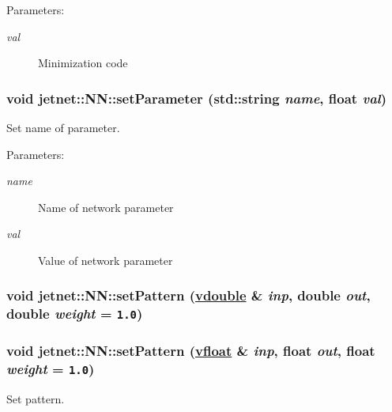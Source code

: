 \begin{Desc}
\item[Parameters:]
\begin{description}
\item[{\em val}]Minimization code \end{description}
\end{Desc}
\hypertarget{classjetnet_1_1NN_a5}{
\subsubsection[setParameter]{\setlength{\rightskip}{0pt plus 5cm}void jetnet::NN::set\-Parameter (std::string {\em name}, float {\em val})}}
\label{classjetnet_1_1NN_a5}


Set name of parameter. 

\begin{Desc}
\item[Parameters:]
\begin{description}
\item[{\em name}]Name of network parameter \item[{\em val}]Value of network parameter \end{description}
\end{Desc}
\hypertarget{classjetnet_1_1NN_a15}{
\subsubsection[setPattern]{\setlength{\rightskip}{0pt plus 5cm}void jetnet::NN::set\-Pattern (\hyperlink{PoissonGammaFit_8hpp_a0}{vdouble} \& {\em inp}, double {\em out}, double {\em weight} = {\tt 1.0})}}
\label{classjetnet_1_1NN_a15}


\hypertarget{classjetnet_1_1NN_a14}{
\subsubsection[setPattern]{\setlength{\rightskip}{0pt plus 5cm}void jetnet::NN::set\-Pattern (\hyperlink{jetnet_8hpp_a0}{vfloat} \& {\em inp}, float {\em out}, float {\em weight} = {\tt 1.0})}}
\label{classjetnet_1_1NN_a14}


Set pattern. 

